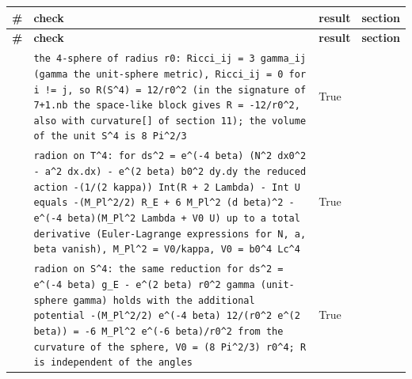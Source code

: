 \documentclass[10pt,a4paper]{article}
\begin{document}
{\footnotesize
\begin{longtable}{>{\raggedright\arraybackslash}p{}>{\raggedright\arraybackslash}p{}>{\raggedright\arraybackslash}p{}>{\raggedright\arraybackslash}p{}}
\toprule
\textbf{\#} & \textbf{check} & \textbf{result} & \textbf{section} \\
\midrule\endfirsthead
\toprule
\textbf{\#} & \textbf{check} & \textbf{result} & \textbf{section} \\
\midrule\endhead
\endfoot
\bottomrule\endlastfoot
1 & \texttt{the 4-sphere of radius r0: Ricci\_\allowbreak{}ij = 3 gamma\_\allowbreak{}ij (gamma the unit-sphere metric), Ricci\_\allowbreak{}ij = 0 for i != j, so R(S\textasciicircum{}4) = 12/\allowbreak{}r0\textasciicircum{}2 (in the signature of 7+1.nb the space-like block gives R = -12/\allowbreak{}r0\textasciicircum{}2, also with curvature[] of section 11); the volume of the unit S\textasciicircum{}4 is 8 Pi\textasciicircum{}2/\allowbreak{}3} & True & 26.1 \\
2 & \texttt{radion on T\textasciicircum{}4: for ds\textasciicircum{}2 = e\textasciicircum{}(-4 beta) (N\textasciicircum{}2 dx0\textasciicircum{}2 - a\textasciicircum{}2 dx.dx) - e\textasciicircum{}(2 beta) b0\textasciicircum{}2 dy.dy the reduced action -(1/\allowbreak{}(2 kappa)) Int(R + 2 Lambda) - Int U equals -(M\_\allowbreak{}Pl\textasciicircum{}2/\allowbreak{}2) R\_\allowbreak{}E + 6 M\_\allowbreak{}Pl\textasciicircum{}2 (d beta)\textasciicircum{}2 - e\textasciicircum{}(-4 beta)(M\_\allowbreak{}Pl\textasciicircum{}2 Lambda + V0 U) up to a total derivative (Euler-Lagrange expressions for N, a, beta vanish), M\_\allowbreak{}Pl\textasciicircum{}2 = V0/\allowbreak{}kappa, V0 = b0\textasciicircum{}4 Lc\textasciicircum{}4} & True & 26.1 \\
3 & \texttt{radion on S\textasciicircum{}4: the same reduction for ds\textasciicircum{}2 = e\textasciicircum{}(-4 beta) g\_\allowbreak{}E - e\textasciicircum{}(2 beta) r0\textasciicircum{}2 gamma (unit-sphere gamma) holds with the additional potential -(M\_\allowbreak{}Pl\textasciicircum{}2/\allowbreak{}2) e\textasciicircum{}(-4 beta) 12/\allowbreak{}(r0\textasciicircum{}2 e\textasciicircum{}(2 beta)) = -6 M\_\allowbreak{}Pl\textasciicircum{}2 e\textasciicircum{}(-6 beta)/\allowbreak{}r0\textasciicircum{}2 from the curvature of the sphere, V0 = (8 Pi\textasciicircum{}2/\allowbreak{}3) r0\textasciicircum{}4; R is independent of the angles} & True & 26.1 \\

\end{longtable}}
\end{document}
